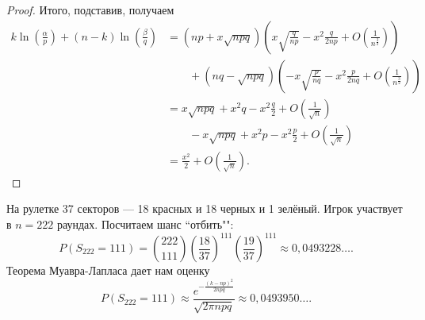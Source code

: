 \begin{proof}
    Итого, подставив, получаем
   \begin{align*}
       k\ln\left(\frac{\alpha}{p}\right) + (n - k)\ln\left(\frac{\beta}{q}\right) &= (np + x\sqrt{npq})\left(x\sqrt{\frac{q}{np}} - x^2 \frac{q}{2np}
        + O\left(\frac{1}{n^\frac{3}{2}}\right)\right) \\& \quad\quad + (nq - \sqrt{npq})\left(-x\sqrt{\frac{p}{nq}} - x^2 \frac{p}{2nq}
        + O\left(\frac{1}{n^\frac{3}{2}}\right)\right) \\&= x\sqrt{npq} + x^2q - x^2\frac{q}{2} + O\left(\frac{1}{\sqrt{n}}\right) \\& \quad\quad - x\sqrt{npq}
        +x^2p-x^2\frac{p}{2} + O\left(\frac{1}{\sqrt{n}}\right) \\&= \frac{x^2}{2} + O\left(\frac{1}{\sqrt{n}}\right).
   \end{align*}
  

\end{proof}

\begin{example}На рулетке 37 секторов --- 18 красных и 18 черных и 1 зелёный. Игрок участвует в $n = 222$ раундах. Посчитаем шанс ``отбить"":
    $$P(S_{222} = 111) = \binom{222}{111}(\frac{18}{37})^{111}(\frac{19}{37})^{111} \approx 0,0493228\ldots.$$
    Теорема Муавра-Лапласа дает нам оценку
   $$ P(S_{222} = 111)\approx \frac{e^{-\frac{(k - np)^2}{2npq}}}{\sqrt{2\pi npq}}\approx 0,0493950\ldots.$$
\end{example}
